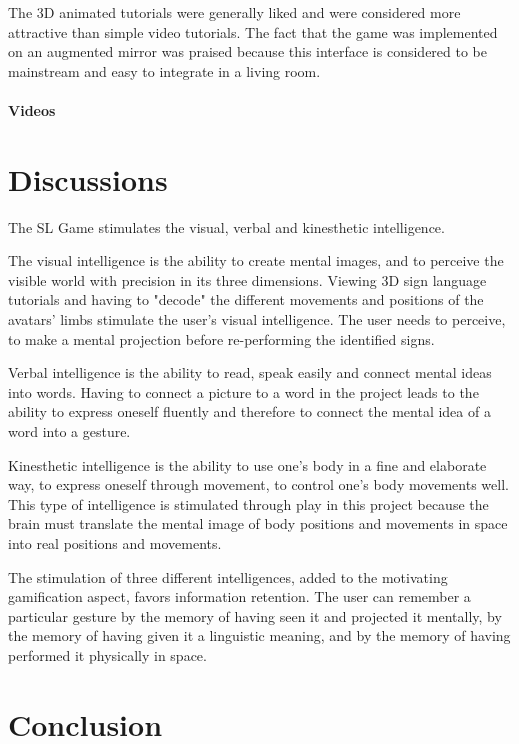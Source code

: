 The 3D animated tutorials were generally liked and were considered more attractive than simple video tutorials. The fact that the game was implemented on an augmented mirror was praised because this interface is considered to be mainstream and easy to integrate in a living room.


\paragraph{Videos}


\section{Discussions}

The SL Game stimulates the visual, verbal and kinesthetic intelligence. 

The visual intelligence is the ability to create mental images, and to perceive the visible world with precision in its three dimensions. Viewing 3D sign language tutorials and having to "decode" the different movements and positions of the avatars' limbs stimulate the user's visual intelligence. The user needs to perceive, to make a mental projection before re-performing the identified signs.

Verbal intelligence is the ability to read, speak easily and connect mental ideas into words. Having to connect a picture to a word in the project leads to the ability to express oneself fluently and therefore to connect the mental idea of a word into a gesture. 

Kinesthetic intelligence is the ability to use one's body in a fine and elaborate way, to express oneself through movement, to control one's body movements well. This type of intelligence is stimulated through play in this project because the brain must translate the mental image of body positions and movements in space into real positions and movements. 

The stimulation of three different intelligences, added to the motivating gamification aspect, favors information retention. The user can remember a particular gesture by the memory of having seen it and projected it mentally, by the memory of having given it a linguistic meaning, and by the memory of having performed it physically in space.

\section{Conclusion}

